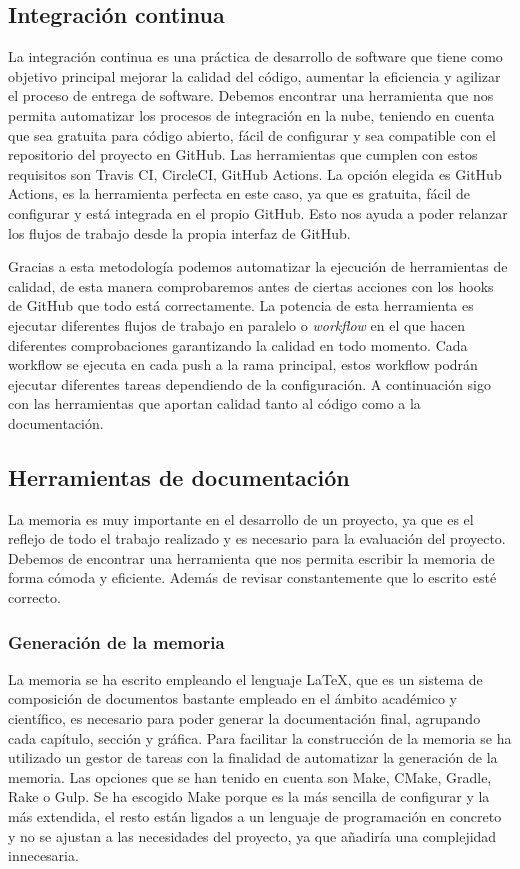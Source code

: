 \subsection{Integración continua}
La integración continua es una práctica de desarrollo de software que tiene como objetivo principal mejorar la calidad del código, aumentar la eficiencia y agilizar el proceso de entrega de software.
Debemos encontrar una herramienta que nos permita automatizar los procesos de integración en la nube, teniendo en cuenta que sea gratuita para código abierto, fácil de configurar y sea compatible con el repositorio del proyecto en GitHub.
Las herramientas que cumplen con estos requisitos son Travis CI, CircleCI, GitHub Actions. La opción elegida es GitHub Actions, es la herramienta perfecta en este caso, ya que es gratuita, fácil de configurar y está integrada en el propio GitHub.
Esto nos ayuda a poder relanzar los flujos de trabajo desde la propia interfaz de GitHub.

Gracias a esta metodología podemos automatizar la ejecución de herramientas de calidad, de esta manera comprobaremos antes de ciertas acciones con los hooks de GitHub que todo está correctamente.
La potencia de esta herramienta es ejecutar diferentes flujos de trabajo en paralelo o \textit{workflow} en el que hacen diferentes comprobaciones garantizando la calidad en todo momento.
Cada workflow se ejecuta en cada push a la rama principal, estos workflow podrán ejecutar diferentes tareas dependiendo de la configuración.
A continuación sigo con las herramientas que aportan calidad tanto al código como a la documentación.

\subsection{Herramientas de documentación}
La memoria es muy importante en el desarrollo de un proyecto, ya que es el reflejo de todo el trabajo realizado y es necesario para la evaluación del proyecto.
Debemos de encontrar una herramienta que nos permita escribir la memoria de forma cómoda y eficiente. Además de revisar constantemente que lo escrito esté correcto.

\subsubsection{Generación de la memoria}
La memoria se ha escrito empleando el lenguaje LaTeX, que es un sistema de composición de documentos bastante empleado
en el ámbito académico y científico, es necesario para poder generar la documentación final, agrupando cada capítulo, sección y
gráfica. Para facilitar la construcción de la memoria se ha utilizado un gestor de tareas con la finalidad de automatizar la generación de la memoria.
Las opciones que se han tenido en cuenta son Make, CMake, Gradle, Rake o Gulp. Se ha escogido Make porque es la más sencilla de configurar y la más extendida, el resto
están ligados a un lenguaje de programación en concreto y no se ajustan a las necesidades del proyecto, ya que añadiría una complejidad innecesaria.

